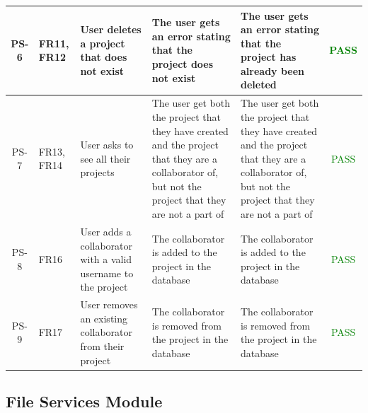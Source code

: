 \documentclass[12pt, titlepage]{article}
\begin{document}
\begin{center}
\begin{longtable}{|c|p{1cm}|p{2.7cm}|p{3cm}|p{3cm}|c|}
        \hline
        PS-6 & FR11, FR12  & User deletes a project that does not exist & The user gets an error stating that the project does not exist & The user gets an error stating that the project has already been deleted &  \textcolor{green}{PASS} \\
        \hline
        PS-7 & FR13, FR14 & User asks to see all their projects & The user get both the project that they have created and the project that they are a collaborator of, but not the project that they are not a part of & The user get both the project that they have created and the project that they are a collaborator of, but not the project that they are not a part of &  \textcolor{green}{PASS} \\
        \hline
        PS-8 & FR16 & User adds a collaborator with a valid username to the project & The collaborator is added to the project in the database & The collaborator is added to the project in the database &  \textcolor{green}{PASS} \\
        \hline
        PS-9 & FR17 & User removes an existing collaborator from their project & The collaborator is removed from the project in the database & The collaborator is removed from the project in the database &  \textcolor{green}{PASS} \\
        \hline
    \end{longtable}
\end{center}

\subsection{File Services Module}
\end{document}

